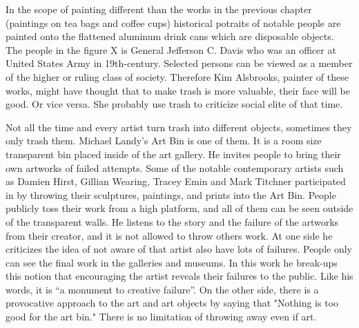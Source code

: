 
In the scope of painting different than the works in the previous chapter (paintings on tea bags and coffee cups) historical potraits of notable people are painted onto the flattened aluminum drink cans which are disposable objects. The people in the figure X is General Jefferson C. Davis who was an officer at United States Army in 19th-century. Selected persons can be viewed as a member of the higher or ruling class of society. Therefore Kim Alsbrooks, painter of these works, might have thought that to make trash is more valuable, their face will be good. Or vice versa. She probably use trash to criticize social elite of that time. 


Not all the time and every artist turn trash into different objects, sometimes they only trash them. Michael Landy's Art Bin is one of them. It is a room size transparent bin placed inside of the art gallery. He invites people to bring their own artworks of failed attempts. Some of the notable contemporary artists such as Damien Hirst, Gillian Wearing, Tracey Emin and Mark Titchner participated in by throwing their sculptures, paintings, and prints into the Art Bin. People publicly toss their work from a high platform, and all of them can be seen outside of the transparent walls. He listens to the story and the failure of the artworks from their creator, and it is not allowed to throw others work. At one side he criticizes the idea of not aware of that artist also have lots of failures. People only can see the final work in the galleries and museums. In this work he break-ups this notion that encouraging the artist reveals their failures to the public. Like his words, it is “a monument to creative failure”. On the other side, there is a provocative approach to the art and art objects by saying that "Nothing is too good for the art bin." There is no limitation of throwing away even if art. 


